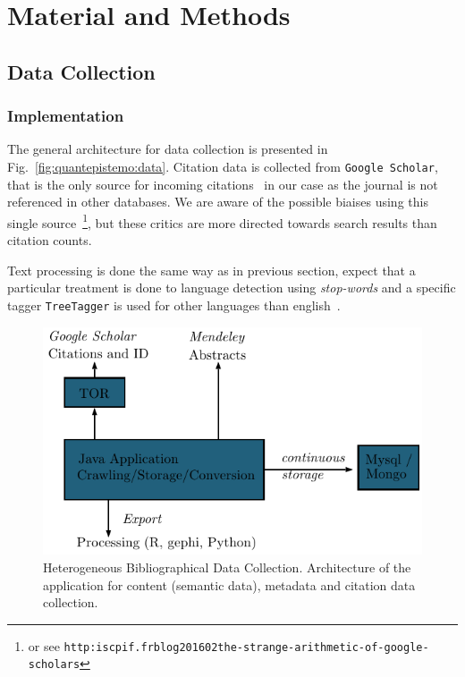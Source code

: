 \section{Material and Methods}
\label{sec:methods}



\subsection{Data Collection}



\subsubsection{Implementation}

The general architecture for data collection is presented in Fig.~\ref{fig:quantepistemo:data}. Citation data is collected from \texttt{Google Scholar}, that is the only source for incoming citations~\cite{noruzi2005google} in our case as the journal is not referenced in other databases. We are aware of the possible biaises using this single source~\cite{bohannon2014scientific}\footnote{or see \texttt{http:\/\/iscpif.fr\/blog\/2016\/02\/the-strange-arithmetic-of-google-scholars}}, but these critics are more directed towards search results than citation counts. 

Text processing is done the same way as in previous section, expect that a particular treatment is done to language detection using \emph{stop-words} and a specific tagger \texttt{TreeTagger} is used for other languages than english~\cite{schmid1994probabilistic}.


\begin{figure}
\includegraphics[width=\textwidth]{figures/archi}
\caption[Heterogeneous Bibliographical Data Collection]{Heterogeneous Bibliographical Data Collection. Architecture of the application for content (semantic data), metadata and citation data collection.}
\label{fig:datacollection}
\end{figure}






